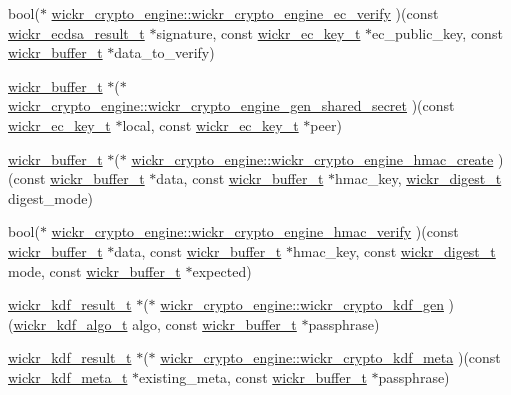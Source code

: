 \begin{DoxyCompactItemize}
\item 
bool($\ast$ \mbox{\hyperlink{group__wickr__crypto__engine_gae541acc6433f6f5ffe84382ccd5e4f97}{wickr\+\_\+crypto\+\_\+engine\+::wickr\+\_\+crypto\+\_\+engine\+\_\+ec\+\_\+verify}} )(const \mbox{\hyperlink{structwickr__ecdsa__result}{wickr\+\_\+ecdsa\+\_\+result\+\_\+t}} $\ast$signature, const \mbox{\hyperlink{structwickr__ec__key}{wickr\+\_\+ec\+\_\+key\+\_\+t}} $\ast$ec\+\_\+public\+\_\+key, const \mbox{\hyperlink{structwickr__buffer}{wickr\+\_\+buffer\+\_\+t}} $\ast$data\+\_\+to\+\_\+verify)
\item 
\mbox{\hyperlink{structwickr__buffer}{wickr\+\_\+buffer\+\_\+t}} $\ast$($\ast$ \mbox{\hyperlink{group__wickr__crypto__engine_gab624f62e1d434c5b8222eabd656feb48}{wickr\+\_\+crypto\+\_\+engine\+::wickr\+\_\+crypto\+\_\+engine\+\_\+gen\+\_\+shared\+\_\+secret}} )(const \mbox{\hyperlink{structwickr__ec__key}{wickr\+\_\+ec\+\_\+key\+\_\+t}} $\ast$local, const \mbox{\hyperlink{structwickr__ec__key}{wickr\+\_\+ec\+\_\+key\+\_\+t}} $\ast$peer)
\item 
\mbox{\hyperlink{structwickr__buffer}{wickr\+\_\+buffer\+\_\+t}} $\ast$($\ast$ \mbox{\hyperlink{group__wickr__crypto__engine_ga782e0e8786ecf8a55c8ae2aea2f178aa}{wickr\+\_\+crypto\+\_\+engine\+::wickr\+\_\+crypto\+\_\+engine\+\_\+hmac\+\_\+create}} )(const \mbox{\hyperlink{structwickr__buffer}{wickr\+\_\+buffer\+\_\+t}} $\ast$data, const \mbox{\hyperlink{structwickr__buffer}{wickr\+\_\+buffer\+\_\+t}} $\ast$hmac\+\_\+key, \mbox{\hyperlink{structwickr__digest}{wickr\+\_\+digest\+\_\+t}} digest\+\_\+mode)
\item 
bool($\ast$ \mbox{\hyperlink{group__wickr__crypto__engine_ga00c52a816403192af5b21d952265d0b6}{wickr\+\_\+crypto\+\_\+engine\+::wickr\+\_\+crypto\+\_\+engine\+\_\+hmac\+\_\+verify}} )(const \mbox{\hyperlink{structwickr__buffer}{wickr\+\_\+buffer\+\_\+t}} $\ast$data, const \mbox{\hyperlink{structwickr__buffer}{wickr\+\_\+buffer\+\_\+t}} $\ast$hmac\+\_\+key, const \mbox{\hyperlink{structwickr__digest}{wickr\+\_\+digest\+\_\+t}} mode, const \mbox{\hyperlink{structwickr__buffer}{wickr\+\_\+buffer\+\_\+t}} $\ast$expected)
\item 
\mbox{\hyperlink{structwickr__kdf__result}{wickr\+\_\+kdf\+\_\+result\+\_\+t}} $\ast$($\ast$ \mbox{\hyperlink{group__wickr__crypto__engine_ga5ab29968c993423df83c9f1a3d7e685d}{wickr\+\_\+crypto\+\_\+engine\+::wickr\+\_\+crypto\+\_\+kdf\+\_\+gen}} )(\mbox{\hyperlink{structwickr__kdf__algo}{wickr\+\_\+kdf\+\_\+algo\+\_\+t}} algo, const \mbox{\hyperlink{structwickr__buffer}{wickr\+\_\+buffer\+\_\+t}} $\ast$passphrase)
\item 
\mbox{\hyperlink{structwickr__kdf__result}{wickr\+\_\+kdf\+\_\+result\+\_\+t}} $\ast$($\ast$ \mbox{\hyperlink{group__wickr__crypto__engine_ga640cbc86ca36c4deb2c197de89dce7d1}{wickr\+\_\+crypto\+\_\+engine\+::wickr\+\_\+crypto\+\_\+kdf\+\_\+meta}} )(const \mbox{\hyperlink{structwickr__kdf__meta}{wickr\+\_\+kdf\+\_\+meta\+\_\+t}} $\ast$existing\+\_\+meta, const \mbox{\hyperlink{structwickr__buffer}{wickr\+\_\+buffer\+\_\+t}} $\ast$passphrase)
\end{DoxyCompactItemize}


